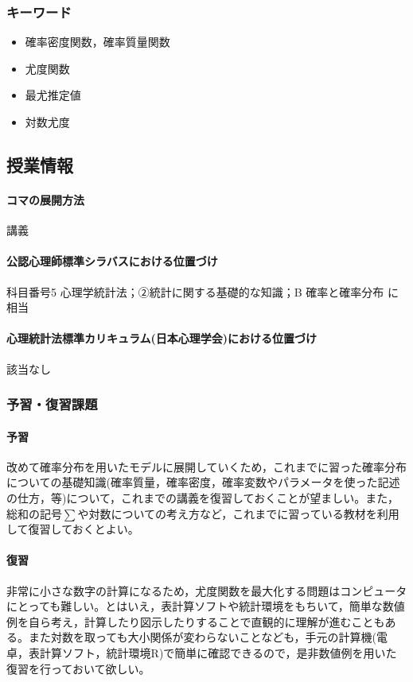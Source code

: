 \subsubsection{キーワード}
\begin{itemize}
	\item 確率密度関数，確率質量関数
	\item 尤度関数
	\item 最尤推定値
	\item 対数尤度
\end{itemize}
\subsection{授業情報}
\paragraph{コマの展開方法}
講義
\paragraph{公認心理師標準シラバスにおける位置づけ}
科目番号5 心理学統計法；②統計に関する基礎的な知識；B 確率と確率分布 に相当
\paragraph{心理統計法標準カリキュラム(日本心理学会)における位置づけ}
該当なし
\subsubsection{予習・復習課題}
\paragraph{予習}
改めて確率分布を用いたモデルに展開していくため，これまでに習った確率分布についての基礎知識(確率質量，確率密度，確率変数やパラメータを使った記述の仕方，等)について，これまでの講義を復習しておくことが望ましい。また，総和の記号$\sum$や対数についての考え方など，これまでに習っている教材を利用して復習しておくとよい。
\paragraph{復習}
非常に小さな数字の計算になるため，尤度関数を最大化する問題はコンピュータにとっても難しい。とはいえ，表計算ソフトや統計環境をもちいて，簡単な数値例を自ら考え，計算したり図示したりすることで直観的に理解が進むこともある。また対数を取っても大小関係が変わらないことなども，手元の計算機(電卓，表計算ソフト，統計環境R)で簡単に確認できるので，是非数値例を用いた復習を行っておいて欲しい。